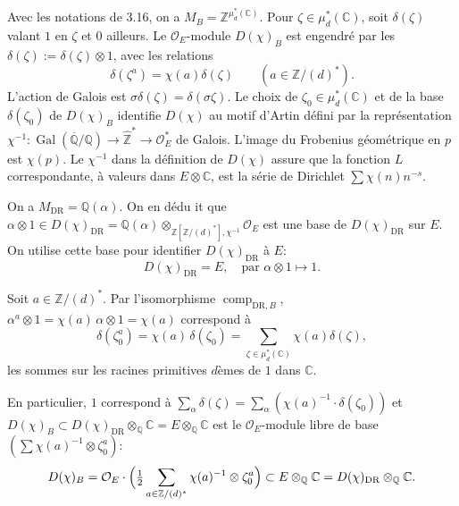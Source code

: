\documentclass[12pt,a4paper]{article}
\theoremstyle{plain}
\theoremstyle{definition}
\theoremstyle{remark}
\DeclareMathOperator{\Gal}{Gal}
\providecommand{\Gal}{\operatorname{Gal}}
\providecommand{\DR}{\mathrm{DR}}
\providecommand{\comp}{\operatorname{comp}}
\begin{document}
Avec les notations de 3.16, on a $M_B = \mathbb{Z}^{\mu_d^*(\mathbb{C})}$. Pour
$\zeta \in \mu_d^*(\mathbb{C})$, soit $\delta(\zeta)$ valant $1$ en $\zeta$ et $0$
ailleurs. Le $\mathcal{O}_E$-module $D(\chi)_B$ est engendr\'e par les
$\delta(\zeta) := \delta(\zeta) \otimes 1$, avec les relations
\begin{equation}\label{eq:3.17.1}
\delta(\zeta^a) = \chi(a) \delta(\zeta) \qquad (a \in \mathbb{Z}/(d)^*).
\end{equation}
L'action de Galois est $\sigma \delta(\zeta) = \delta(\sigma\zeta)$. Le choix de
$\zeta_0 \in \mu_d^*(\mathbb{C})$ et de la base $\delta(\zeta_0)$ de $D(\chi)_B$
identifie $D(\chi)$ au motif d'Artin d\'efini par la repr\'esentation
$\chi^{-1}: \Gal(\overline{\mathbb{Q}}/\mathbb{Q}) \to \hat{\mathbb{Z}}^* \to
\mathcal{O}_E^*$ de Galois. L'image du Frobenius g\'eom\'etrique en $p$ est
$\chi(p)$. Le $\chi^{-1}$ dans la d\'efinition de $D(\chi)$ assure que la fonction $L$
correspondante, \`a valeurs dans $E \otimes \mathbb{C}$, est la s\'erie de Dirichlet
$\sum \chi(n) n^{-s}$.

On a $M_{\DR} = \mathbb{Q}(\alpha)$. On en d\'edu it que
$\alpha \otimes 1 \in D(\chi)_{\DR} = \mathbb{Q}(\alpha)
\otimes_{\mathbb{Z}[\mathbb{Z}/(d)^*], \chi^{-1}} \mathcal{O}_E$ est une base de
$D(\chi)_{\DR}$ sur $E$. On utilise cette base pour identifier $D(\chi)_{\DR}$ \`a $E$:
\begin{equation}\label{eq:3.17.2}
D(\chi)_{\DR} = E, \quad \text{par } \alpha \otimes 1 \longmapsto 1.
\end{equation}

Soit $a \in \mathbb{Z}/(d)^*$. Par l'isomorphisme $\comp_{\DR,B}$,
$\alpha^a \otimes 1 = \chi(a) \, \alpha \otimes 1 = \chi(a)$ correspond \`a
\begin{equation}\label{eq:3.17.3}
\delta(\zeta_0^a) = \chi(a) \, \delta(\zeta_0) = \sum_{\zeta \in
\mu_d^*(\mathbb{C})} \chi(a) \delta(\zeta),
\end{equation}
les sommes sur les racines primitives $d$\`emes de $1$ dans $\mathbb{C}$.

En particulier, $1$ correspond \`a $\sum_{\alpha} \delta(\zeta) = \sum_\alpha
(\chi(a)^{-1} \cdot \delta(\zeta_0))$ et $D(\chi)_B \subset D(\chi)_{\DR} \otimes_{\mathbb{Q}}
\mathbb{C} = E \otimes_{\mathbb{Q}} \mathbb{C}$ est le $\mathcal{O}_E$-module libre de base
$(\sum \chi(a)^{-1} \otimes \zeta_0^a)$:
\begin{equation}\label{eq:3.17.4}
D(\chi)_B = \mathcal{O}_E \cdot \Bigl(\tfrac{1}{2} \sum_{a \in \mathbb{Z}/(d)^*}
\chi(a)^{-1} \otimes \zeta_0^a\Bigr) \subset E \otimes_{\mathbb{Q}} \mathbb{C} =
D(\chi)_{\DR} \otimes_{\mathbb{Q}} \mathbb{C}.
\end{equation}
\end{document}
